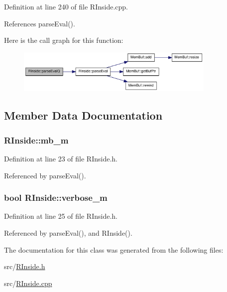 Definition at line 240 of file RInside.cpp.

References parseEval().

Here is the call graph for this function:\nopagebreak
\begin{figure}[H]
\begin{center}
\leavevmode
\includegraphics[width=271pt]{classRInside_a9f18dc5011e1e32a52360b3d88f9bab7_cgraph}
\end{center}
\end{figure}


\subsection{Member Data Documentation}
\hypertarget{classRInside_ad078e52002a242f7f5c94211ca3dd8be}{
\subsubsection[{mb\_\-m}]{ {\bf RInside::mb\_\-m}}}
\label{classRInside_ad078e52002a242f7f5c94211ca3dd8be}


Definition at line 23 of file RInside.h.

Referenced by parseEval().\hypertarget{classRInside_a186dad3e463fedc586f3d02784a814b2}{
\subsubsection[{verbose\_\-m}]{\setlength{\rightskip}{0pt plus 5cm}bool {\bf RInside::verbose\_\-m}}}
\label{classRInside_a186dad3e463fedc586f3d02784a814b2}


Definition at line 25 of file RInside.h.

Referenced by parseEval(), and RInside().

The documentation for this class was generated from the following files:\begin{DoxyCompactItemize}
\item 
src/\hyperlink{RInside_8h}{RInside.h}\item 
src/\hyperlink{RInside_8cpp}{RInside.cpp}\end{DoxyCompactItemize}

